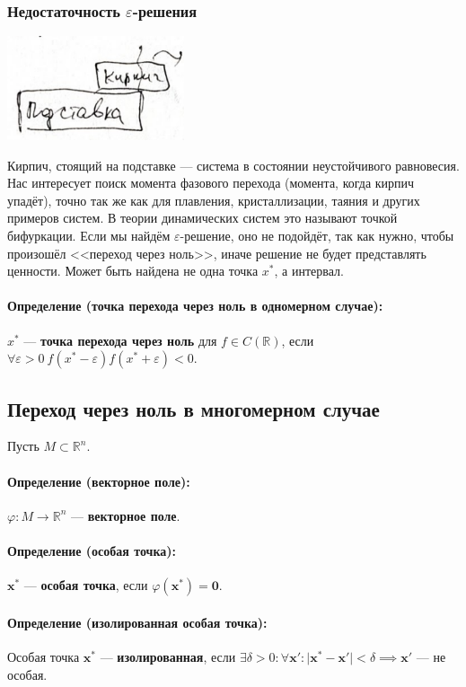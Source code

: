 \subsubsection{Недостаточность $\varepsilon$-решения}
\begin{center}
    \includegraphics[width=5.2cm]{../figures/lection_1/figure_1.png}
\end{center}
Кирпич, стоящий на подставке --- система в состоянии неустойчивого равновесия. Нас интересует поиск момента фазового перехода (момента, когда кирпич упадёт), точно так же как для плавления, кристаллизации, таяния и других примеров систем. В теории динамических систем это называют точкой бифуркации. Если мы найдём $\varepsilon$-решение, оно не подойдёт, так как нужно, чтобы произошёл <<переход через ноль>>, иначе решение не будет представлять ценности. Может быть найдена не одна точка $x^*$, а интервал.
\paragraph{Определение (точка перехода через ноль в одномерном случае):} $x^*$ --- \textbf{точка перехода через ноль} для $f\in C(\mathbb{R})$, если $\forall \varepsilon > 0 \  f(x^*-\varepsilon)f(x^*+\varepsilon) < 0$.
\subsection{Переход через ноль в многомерном случае}
Пусть $M \subset \mathbb{R}^n$.
\paragraph{Определение (векторное поле):} $\varphi:M\rightarrow\mathbb{R}^n$ --- \textbf{векторное поле}.
\paragraph{Определение (особая точка):} $\mathbf{x^*}$ --- \textbf{особая точка}, если $\varphi(\mathbf{x^*})=\mathbf{0}$.
\paragraph{Определение (изолированная особая точка):} Особая точка $\mathbf{x^*}$ --- \textbf{изолированная}, если $\exists \delta > 0: \forall \mathbf{x'}: \vert\mathbf{x^*}-\mathbf{x'}\vert<\delta \implies \mathbf{x'}$ --- не особая.
